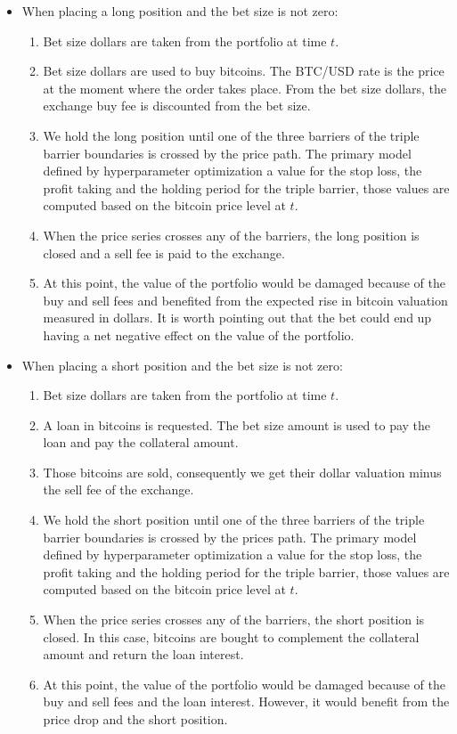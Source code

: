 \begin{itemize}
  \item When placing a long position and the bet size is not zero:
  \begin{enumerate}
    \item Bet size dollars are taken from the portfolio at time $t$.
    \item Bet size dollars are used to buy bitcoins. The BTC/USD
          rate is the price at the moment where the order takes place. From the
          bet size dollars, the exchange buy fee is discounted from the bet
          size.
    \item We hold the long position until one of the three barriers
          of the triple barrier boundaries is crossed by the price 
          path. The primary model defined by hyperparameter 
          optimization a value for the stop loss, the profit taking and the
          holding period for the triple barrier, those values are computed based
          on the bitcoin price level at $t$.
    \item When the price series crosses any of the barriers, the 
          long position is closed and a sell fee is paid to the exchange.
    \item At this point, the value of the portfolio would be damaged 
          because of the buy and sell fees and benefited from the
          expected rise in bitcoin valuation measured in dollars. It
          is worth pointing out that the bet could end up having a
          net negative effect on the value of the portfolio.
  \end{enumerate}
  \item When placing a short position and the bet size is not zero:
  \begin{enumerate}
    \item Bet size dollars are taken from the portfolio at time $t$.
    \item A loan in bitcoins is requested. The bet size amount is
          used to pay the loan and pay the collateral amount.
    \item Those bitcoins are sold, consequently we get their 
          dollar valuation minus the sell fee of the exchange.
    \item We hold the short position until one of the three barriers
          of the triple barrier boundaries is crossed by the prices path. The
          primary model defined by hyperparameter optimization a value for the
          stop loss, the profit taking and the holding period for the triple
          barrier, those values are computed based on the bitcoin price level
          at $t$.
    \item When the price series crosses any of the barriers, the 
          short position is closed. In this case, bitcoins are bought
          to complement the collateral amount and return the loan interest.
    \item At this point, the value of the portfolio would be damaged 
          because of the buy and sell fees and the loan interest. However, it
          would benefit from the price drop and the short position.
  \end{enumerate}
\end{itemize}

